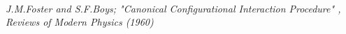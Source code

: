 \documentclass[mathserif]{beamer}
\begin{document}
\begin{frame}
\begin{columns}
\begin{column}[b]{0.48\linewidth}
\begin{center}
    \end{center}
    \end{column}
    \end{columns}
    \ \\
    \tiny \it{J.M.Foster and S.F.Boys; "Canonical Configurational Interaction Procedure" 
	    , Reviews of Modern Physics (1960)}
\end{frame}
\end{document}
